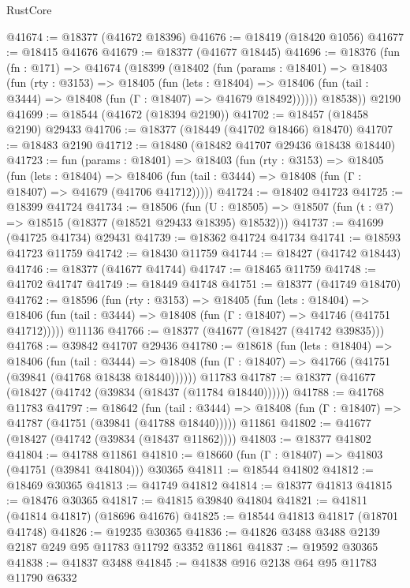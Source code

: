 \begin{lexlean}{RustCore}
\begin{coremodule}
@41674 := @18377 (@41672 @18396)
@41676 := @18419 (@18420 @1056)
@41677 := @18415 @41676
@41679 := @18377 (@41677 @18445)
@41696 := @18376
    (fun (fn : @171) =>
    @41674
      (@18399
        (@18402
          (fun (params : @18401) =>
          @18403
            (fun (rty : @3153) =>
            @18405
              (fun (lets : @18404) =>
              @18406 (fun (tail : @3444) => @18408 (fun (Γ : @18407) => @41679 @18492))))))
        @18538))
    @2190
@41699 := @18544 (@41672 (@18394 @2190))
@41702 := @18457 (@18458 @2190) @29433
@41706 := @18377 (@18449 (@41702 @18466) @18470)
@41707 := @18483 @2190
@41712 := @18480 (@18482 @41707 @29436 @18438 @18440)
@41723 := fun (params : @18401) =>
  @18403
    (fun (rty : @3153) =>
    @18405
      (fun (lets : @18404) =>
      @18406 (fun (tail : @3444) => @18408 (fun (Γ : @18407) => @41679 (@41706 @41712)))))
@41724 := @18402 @41723
@41725 := @18399 @41724
@41734 := @18506
    (fun (U : @18505) => @18507 (fun (t : @7) => @18515 (@18377 (@18521 @29433 @18395) @18532)))
@41737 := @41699 (@41725 @41734) @29431
@41739 := @18362 @41724 @41734
@41741 := @18593 @41723 @11759
@41742 := @18430 @11759
@41744 := @18427 (@41742 @18443)
@41746 := @18377 (@41677 @41744)
@41747 := @18465 @11759
@41748 := @41702 @41747
@41749 := @18449 @41748
@41751 := @18377 (@41749 @18470)
@41762 := @18596
    (fun (rty : @3153) =>
    @18405
      (fun (lets : @18404) =>
      @18406 (fun (tail : @3444) => @18408 (fun (Γ : @18407) => @41746 (@41751 @41712)))))
    @11136
@41766 := @18377 (@41677 (@18427 (@41742 @39835)))
@41768 := @39842 @41707 @29436
@41780 := @18618
    (fun (lets : @18404) =>
    @18406
      (fun (tail : @3444) =>
      @18408 (fun (Γ : @18407) => @41766 (@41751 (@39841 (@41768 @18438 @18440))))))
    @11783
@41787 := @18377 (@41677 (@18427 (@41742 (@39834 (@18437 (@11784 @18440))))))
@41788 := @41768 @11783
@41797 := @18642
    (fun (tail : @3444) => @18408 (fun (Γ : @18407) => @41787 (@41751 (@39841 (@41788 @18440)))))
    @11861
@41802 := @41677 (@18427 (@41742 (@39834 (@18437 @11862))))
@41803 := @18377 @41802
@41804 := @41788 @11861
@41810 := @18660 (fun (Γ : @18407) => @41803 (@41751 (@39841 @41804))) @30365
@41811 := @18544 @41802
@41812 := @18469 @30365
@41813 := @41749 @41812
@41814 := @18377 @41813
@41815 := @18476 @30365
@41817 := @41815 @39840 @41804
@41821 := @41811 (@41814 @41817) (@18696 @41676)
@41825 := @18544 @41813 @41817 (@18701 @41748)
@41826 := @19235 @30365
@41836 := @41826 @3488 @3488 @2139 @2187 @249 @95 @11783 @11792 @3352 @11861
@41837 := @19592 @30365
@41838 := @41837 @3488
@41845 := @41838 @916 @2138 @64 @95 @11783 @11790 @6332

\end{coremodule}
\end{lexlean}
